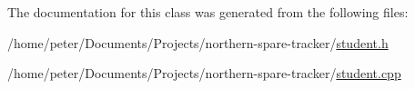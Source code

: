 The documentation for this class was generated from the following files\+:\begin{DoxyCompactItemize}
\item 
/home/peter/\+Documents/\+Projects/northern-\/spare-\/tracker/\hyperlink{student_8h}{student.\+h}\item 
/home/peter/\+Documents/\+Projects/northern-\/spare-\/tracker/\hyperlink{student_8cpp}{student.\+cpp}\end{DoxyCompactItemize}

